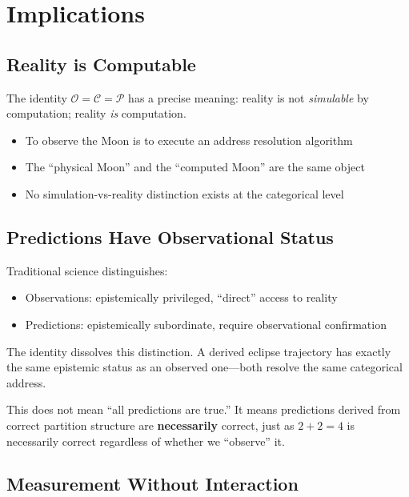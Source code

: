 \documentclass[12pt,a4paper]{article}
\theoremstyle{definition}
\theoremstyle{remark}
\newcommand{\Obs}{\mathcal{O}}
\newcommand{\Comp}{\mathcal{C}}
\newcommand{\Proc}{\mathcal{P}}
\begin{document}
\section{Implications}
\label{sec:implications}

\subsection{Reality is Computable}

The identity $\Obs = \Comp = \Proc$ has a precise meaning: reality is not \emph{simulable} by computation; reality \emph{is} computation.

\begin{itemize}
    \item To observe the Moon is to execute an address resolution algorithm
    \item The ``physical Moon'' and the ``computed Moon'' are the same object
    \item No simulation-vs-reality distinction exists at the categorical level
\end{itemize}

\subsection{Predictions Have Observational Status}

Traditional science distinguishes:
\begin{itemize}
    \item Observations: epistemically privileged, ``direct'' access to reality
    \item Predictions: epistemically subordinate, require observational confirmation
\end{itemize}

The identity dissolves this distinction. A derived eclipse trajectory has exactly the same epistemic status as an observed one---both resolve the same categorical address.

This does not mean ``all predictions are true.'' It means predictions derived from correct partition structure are \textbf{necessarily} correct, just as $2+2=4$ is necessarily correct regardless of whether we ``observe'' it.

\subsection{Measurement Without Interaction}
\end{document}
